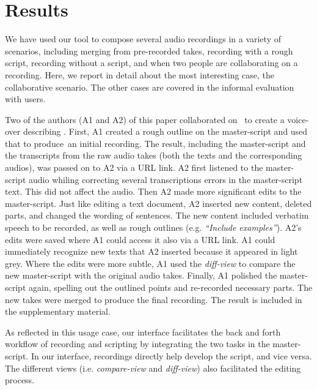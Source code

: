 \section{Results}
We have used our tool to compose several audio recordings in a variety of scenarios, including merging from pre-recorded takes, recording with a rough script, recording without a script, and when two people are collaborating on a recording. Here, we report in detail about the most interesting case, the collaborative scenario. The other cases are covered in the informal evaluation with users. 

Two of the authors (A1 and A2) of this paper collaborated on \systemname\ to create a voice-over describing \systemname. First, A1 created a rough outline on the master-script and used that to produce\ an initial recording. The result, including the master-script and the transcripts from the raw audio takes (both the texts and the corresponding audios), was passed on to A2 via a URL link. A2 first listened to the master-script audio whiling correcting several transcriptions errors in the master-script text. This did not affect the audio. Then A2 made more significant edits to the master-script. Just like editing a text document, A2 inserted new content, deleted parts, and changed the wording of sentences. The new content included verbatim speech to be recorded, as well as rough outlines (e.g. \textit{``Include examples''}). A2's edits were saved where A1 could access it also via a URL link. A1 could immediately recognize new texts that A2 inserted because it appeared in light grey. Where the edits were more subtle, A1 used the  \textit{diff-view} to compare the new master-script with the original audio takes. Finally, A1 polished the master-script again, spelling out the outlined points and re-recorded necessary parts. The new takes were merged to produce the final recording. The result is included in the supplementary material.    

As reflected in this usage case, our interface facilitates the back and forth workflow of recording and scripting by integrating the two tasks in the master-script. In our interface, recordings directly help develop the script, and vice versa. The different views (i.e. \textit{compare-view} and \textit{diff-view}) also facilitated the editing process. 
